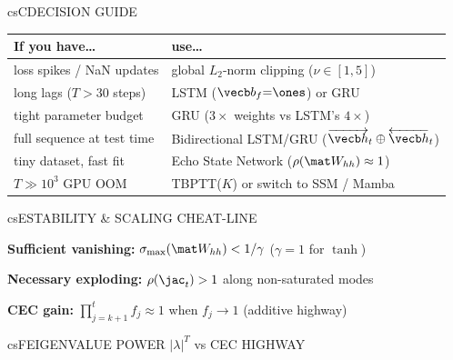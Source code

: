 \documentclass[../../../../master.tex]{subfiles}
\begin{document}
\begin{cscolumns}
\begin{cscard}{csC}{DECISION GUIDE}
  \renewcommand{\arraystretch}{1.22}\small
  \begin{tabular}{@{}>{\raggedright\arraybackslash}p{3.1cm}>{\raggedright\arraybackslash}p{4.6cm}@{}}
    \textbf{If you have\ldots} & \textbf{use\ldots}\\ \hline
    loss spikes / NaN updates & global $L_2$-norm clipping ($\nu\in[1,5]$)\\
    long lags ($T>30$ steps) & LSTM ($\vecb b_f{=}\ones$) or GRU\\
    tight parameter budget & GRU ($3\times$ weights vs LSTM's $4\times$)\\
    full sequence at test time & Bidirectional LSTM/GRU ($\overrightarrow{\vecb h}_t\oplus\overleftarrow{\vecb h}_t$)\\
    tiny dataset, fast fit & Echo State Network ($\rho(\mat W_{hh})\approx 1$)\\
    $T \gg 10^3$ GPU OOM & TBPTT($K$) or switch to SSM / Mamba\\
  \end{tabular}
\end{cscard}

\begin{cscard}{csE}{STABILITY \& SCALING CHEAT-LINE}
  \begin{csbul}
    \item \textbf{Sufficient vanishing:} $\sigma_{\max}(\mat W_{hh}) < 1/\gamma$ ($\gamma{=}1$ for $\tanh$)
    \item \textbf{Necessary exploding:} $\rho(\jac_t) > 1$ along non-saturated modes
    \item \textbf{CEC gain:} $\prod_{j=k+1}^t f_j \approx 1$ when $f_j\to 1$ (additive highway)
  \end{csbul}
\end{cscard}

\begin{cscard}{csF}{EIGENVALUE POWER $|\lambda|^T$ vs CEC HIGHWAY}
  \centering
\end{cscard}
\columnbreak


\end{cscolumns}
\end{document}
